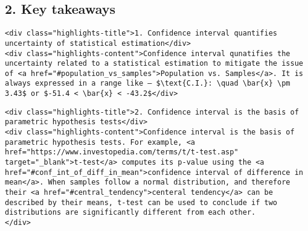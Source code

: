 \documentclass[11pt]{article}
\begin{document}
\subsection{2. Key takeaways}\label{key-takeaways}

\hypertarget{key1}{}
\begin{verbatim}
<div class="highlights-title">1. Confidence interval quantifies uncertainty of statistical estimation</div>
<div class="highlights-content">Confidence interval qunatifies the uncertainty related to a statistical estimation to mitigate the issue of <a href="#population_vs_samples">Population vs. Samples</a>. It is always expressed in a range like — $\text{C.I.}: \quad \bar{x} \pm 3.43$ or $-51.4 < \bar{x} < -43.2$</div>
\end{verbatim}

\hypertarget{key2}{}
\begin{verbatim}
<div class="highlights-title">2. Confidence interval is the basis of parametric hypothesis tests</div>
<div class="highlights-content">Confidence interval is the basis of parametric hypothesis tests. For example, <a href="https://www.investopedia.com/terms/t/t-test.asp" target="_blank">t-test</a> computes its p-value using the <a href="#conf_int_of_diff_in_mean">confidence interval of difference in mean</a>. When samples follow a normal distribution, and therefore their <a href="#central_tendency">centeral tendency</a> can be described by their means, t-test can be used to conclude if two distributions are significantly different from each other. 
</div>
\end{verbatim}
\end{document}
